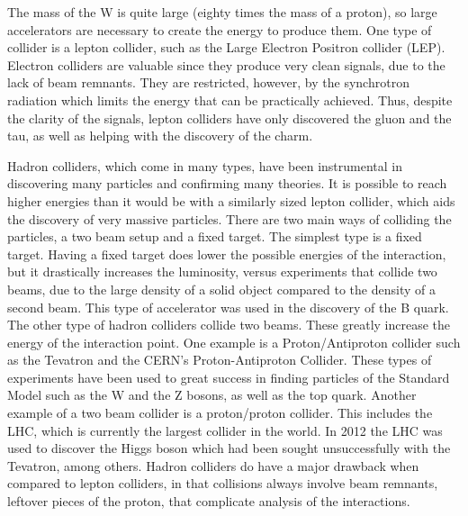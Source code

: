 The mass of the W is quite large (eighty times the mass of a proton), so large accelerators are necessary to create the energy to produce them. One type of collider is a lepton collider, such as the Large Electron Positron collider (LEP). Electron colliders are valuable since they produce very clean signals, due to the lack of beam remnants. They are restricted, however, by the synchrotron radiation which limits the energy that can be practically achieved. Thus, despite the clarity of the signals, lepton colliders have only discovered the gluon and the tau, as well as helping with the discovery of the charm\cite{TauHistory}\cite{GluonHist}. \par
	Hadron colliders, which come in many types, have been instrumental in discovering many particles and confirming many theories. It is possible to reach higher energies than it would be with a similarly sized lepton collider, which aids the discovery of very massive particles. There are two main ways of  colliding the particles, a two beam setup and a fixed target. The simplest type is a fixed target. Having a fixed target does lower the possible energies of the interaction, but it drastically increases the luminosity, versus experiments that collide two beams, due to the large density of a solid object compared to the density of a second beam. This type of accelerator was used in the discovery of the B quark. The other type of hadron colliders collide two beams. These greatly increase the energy of the interaction point. One example is a Proton/Antiproton collider such as the Tevatron and the CERN's Proton-Antiproton Collider. These types of experiments have been used to great success in finding particles of the Standard Model such as the W and the Z bosons, as well as the top quark\cite{ZBosonDiscovery}\cite{Wdiscovery}\cite{WdiscoveryCont}\cite{TopDiscovery}. Another example of a two beam collider is a proton/proton collider. This includes the LHC, which is currently the largest collider in the world. In 2012 the LHC was used to discover the Higgs boson \cite{CMSHiggsPaper} which had been sought unsuccessfully with the Tevatron, among others. Hadron colliders do have a major drawback when compared to lepton colliders, in that collisions always involve beam remnants, leftover pieces of the proton, that complicate analysis of the interactions.\par
    

